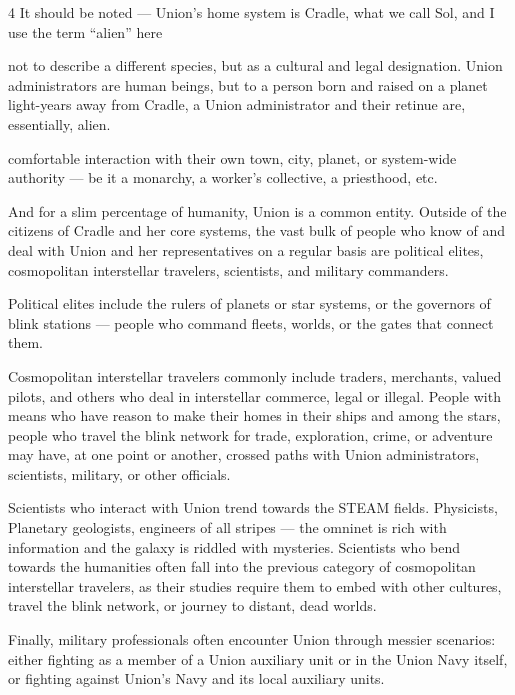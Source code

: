 4 It should be noted — Union’s home system is Cradle, what we call Sol, and I use the term “alien” here  

not to describe a different species, but as a cultural and legal designation. Union administrators are human  
beings, but to a person born and raised on a planet light-years away from Cradle, a Union administrator  
and their retinue are, essentially, alien. 

                                                                                                                


comfortable interaction with their own town, city, planet, or system-wide authority — be it a  
monarchy, a worker’s collective, a priesthood, etc. 
 

And for a slim percentage of humanity, Union is a common entity. Outside of the citizens of  
Cradle and her core systems, the vast bulk of people who know of and deal with Union and her  
representatives on a regular basis are political elites, cosmopolitan interstellar travelers,  
scientists, and military commanders. 
 

Political elites include the rulers of planets or star systems, or the governors of blink stations —  
people who command fleets, worlds, or the gates that connect them.   
 

Cosmopolitan interstellar travelers commonly include traders, merchants, valued pilots, and  
others who deal in interstellar commerce, legal or illegal. People with means who have reason to  
make their homes in their ships and among the stars, people who travel the blink network for  
trade, exploration, crime, or adventure may have, at one point or another, crossed paths with  
Union administrators, scientists, military, or other officials. 
 

Scientists who interact with Union trend towards the STEAM fields. Physicists, Planetary  
geologists, engineers of all stripes — the omninet is rich with information and the galaxy is  
riddled with mysteries. Scientists who bend towards the humanities often fall into the previous  
category of cosmopolitan interstellar travelers, as their studies require them to embed with other  
cultures, travel the blink network, or journey to distant, dead worlds.
 

Finally, military professionals often encounter Union through messier scenarios: either fighting as  
a member of a Union auxiliary unit or in the Union Navy itself, or fighting against Union’s Navy  
and its local auxiliary units. 
 

